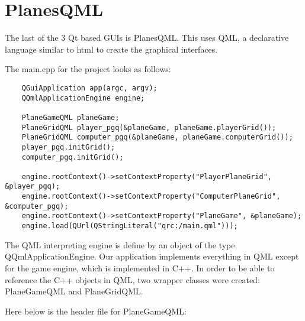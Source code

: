 \section{PlanesQML}

The last of the 3 Qt based GUIs is PlanesQML. This uses QML, a declarative language similar to html to create the graphical interfaces.

The main.cpp for the project looks as follows:

\begin{lstlisting}
	QGuiApplication app(argc, argv);
	QQmlApplicationEngine engine;
	
	PlaneGameQML planeGame;
	PlaneGridQML player_pgq(&planeGame, planeGame.playerGrid());
	PlaneGridQML computer_pgq(&planeGame, planeGame.computerGrid());
	player_pgq.initGrid();
	computer_pgq.initGrid();
	
	engine.rootContext()->setContextProperty("PlayerPlaneGrid", &player_pgq);
	engine.rootContext()->setContextProperty("ComputerPlaneGrid", &computer_pgq);
	engine.rootContext()->setContextProperty("PlaneGame", &planeGame);
	engine.load(QUrl(QStringLiteral("qrc:/main.qml")));
\end{lstlisting}

The QML interpreting engine is define by an object of the type QQmlApplicationEngine. Our application implements everything in QML except for the game engine, which is implemented in C++. In order to be able to reference the C++ objects in QML, two wrapper classes were created: PlaneGameQML and PlaneGridQML. 

Here below is the header file for PlaneGameQML:

